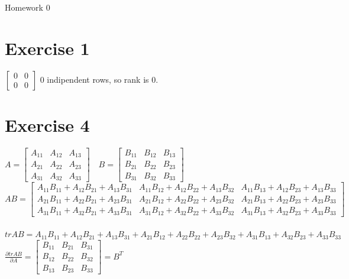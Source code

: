 \documentclass{article}
\begin{document}
    \begin{center}
    {\Large Homework 0}\\
    \end{center}

\section*{Exercise 1}
$\begin{bmatrix}
    0 & 0 \\
    0 & 0
\end{bmatrix}$
0 indipendent rows, so rank is 0.
\section*{Exercise 4}
$A=\begin{bmatrix}
    A_{11} & A_{12} & A_{13} \\
    A_{21} & A_{22} & A_{23} \\
    A_{31} & A_{32} & A_{33}
\end{bmatrix}\quad
B=\begin{bmatrix}
    B_{11} & B_{12} & B_{13} \\
    B_{21} & B_{22} & B_{23} \\
    B_{31} & B_{32} & B_{33}
\end{bmatrix}$
\\
$AB=\begin{bmatrix}
    A_{11}B_{11}+A_{12}B_{21}+A_{13}B_{31} & A_{11}B_{12}+A_{12}B_{22}+A_{13}B_{32} & A_{11}B_{13}+A_{12}B_{23}+A_{13}B_{33} \\
    A_{21}B_{11}+A_{22}B_{21}+A_{23}B_{31} & A_{21}B_{12}+A_{22}B_{22}+A_{23}B_{32} & A_{21}B_{13}+A_{22}B_{23}+A_{23}B_{33} \\
    A_{31}B_{11}+A_{32}B_{21}+A_{33}B_{31} & A_{31}B_{12}+A_{32}B_{22}+A_{33}B_{32} & A_{31}B_{13}+A_{32}B_{23}+A_{33}B_{33}
\end{bmatrix}$
\\
\\
$trAB=A_{11}B_{11}+A_{12}B_{21}+A_{13}B_{31}+A_{21}B_{12}+A_{22}B_{22}+A_{23}B_{32}+A_{31}B_{13}+A_{32}B_{23}+A_{33}B_{33}$
\\
$\frac{\partial trAB}{\partial A}=\begin{bmatrix}
    B_{11} & B_{21} & B_{31} \\
    B_{12} & B_{22} & B_{32} \\
    B_{13} & B_{23} & B_{33}
\end{bmatrix}=B^T$
\\
\end{document}
